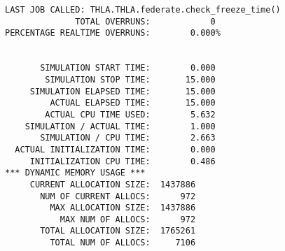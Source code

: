 \begin{lstlisting}[numbers=none,caption={output showing conditionally sent cyclic data}]
LAST JOB CALLED: THLA.THLA.federate.check_freeze_time()
              TOTAL OVERRUNS:            0
PERCENTAGE REALTIME OVERRUNS:        0.000%


       SIMULATION START TIME:        0.000
        SIMULATION STOP TIME:       15.000
     SIMULATION ELAPSED TIME:       15.000
         ACTUAL ELAPSED TIME:       15.000
        ACTUAL CPU TIME USED:        5.632
    SIMULATION / ACTUAL TIME:        1.000
       SIMULATION / CPU TIME:        2.663
  ACTUAL INITIALIZATION TIME:        0.000
     INITIALIZATION CPU TIME:        0.486
*** DYNAMIC MEMORY USAGE ***
     CURRENT ALLOCATION SIZE:  1437886
       NUM OF CURRENT ALLOCS:      972
         MAX ALLOCATION SIZE:  1437886
           MAX NUM OF ALLOCS:      972
       TOTAL ALLOCATION SIZE:  1765261
         TOTAL NUM OF ALLOCS:     7106
\end{lstlisting}
